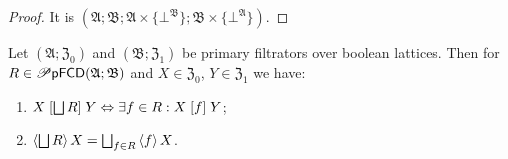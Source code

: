 \begin{proof}
It is $(\mathfrak{A};\mathfrak{B};\mathfrak{A}\times\{\bot^{\mathfrak{B}}\};\mathfrak{B}\times\{\bot^{\mathfrak{A}}\})$.\end{proof}
\begin{thm}
\label{pf-join-core}Let $(\mathfrak{A};\mathfrak{Z}_{0})$ and $(\mathfrak{B};\mathfrak{Z}_{1})$
be primary filtrators over boolean lattices. Then for $R\in\mathscr{P}\mathsf{pFCD}(\mathfrak{A};\mathfrak{B})$
and $X\in\mathfrak{Z}_{0}$, $Y\in\mathfrak{Z}_{1}$ we have:
\begin{enumerate}
\item \label{pf-join-r}$X\mathrel{\left[\bigsqcup R\right]}Y\Leftrightarrow\exists f\in R:X\mathrel{\left[f\right]}Y$;
\item \label{pf-join-f}$\left\langle \bigsqcup R\right\rangle X=\bigsqcup_{f\in R}\left\langle f\right\rangle X$.
\end{enumerate}
\end{thm}
